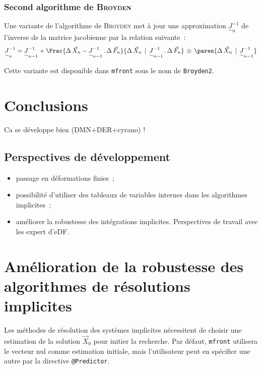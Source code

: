 \documentclass[12pt]{article}
\newcommand{\mfront}{\texttt{mfront}}
\begin{document}
\subsubsection{Second algorithme de \textsc{Broyden}}

Une variante de l'algorithme de \textsc{Broyden} met à jour une
approximation \(\underset{\sim}{J}_{n}^{-1}\) de l'inverse de la matrice
jacobienne par la relation suivante~:
\begin{equation}
  \label{eq:Broyden2}
  \underset{\sim}{J}_{n}^{-1} =
  \underset{\sim}{J}_{n-1}^{-1}+\Frac{\Delta\,\vec{X}_{n}-\underset{\sim}{J}_{n-1}^{-1}\,.\,\Delta\,\vec{F}_{n}}{\Delta\,\vec{X}_{n}\,\mid\,\underset{\sim}{J}_{n-1}^{-1}\,.\,\Delta\,\vec{F}_{n}}\,\otimes\,\paren{\Delta\,\vec{X}_{n}\,\mid\,\underset{\sim}{J}_{n-1}^{-1}}
\end{equation}
  
Cette variante est disponible dans \mfront{} sous le nom de
\texttt{Broyden2}.

\clearpage
\newpage
\section{Conclusions}

Ca se développe bien (DMN+DER+cyrano) !

\subsection{Perspectives de développement}

\begin{itemize}
  \item passage en déformations finies~;
  \item possibilité d'utiliser des tableaux de variables internes dans
  les algorithmes implicites~;
  \item améliorer la robustesse des intégrations implicites.
  Perspectives de travail avec les expert d'eDF.
\end{itemize}

\clearpage
\newpage

 

\appendix

\clearpage
\newpage
\section{Amélioration de la robustesse des algorithmes de résolutions
  implicites}

Les méthodes de résolution des systèmes implicites nécessitent de
choisir une estimation de la solution \(\vec{X}_{0}\) pour initier la
recherche. Par défaut, \mfront{} utilisera le vecteur nul comme
estimation initiale, mais l'utilisateur peut en spécifier une autre par
la directive \texttt{@Predictor}.
\end{document}
